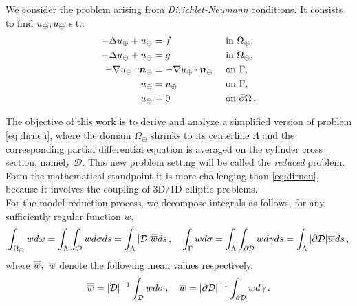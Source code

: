 \documentclass[r]{siamart171218}
\begin{document}
We consider the problem arising from \emph{Dirichlet-Neumann} conditions. 
It consists to find $u_{\oplus},u_{\ominus}$ s.t.:
\begin{subequations}\label{eq:dirneu}
\begin{align}
\label{eq:dirneu1}
- \Delta \up  + \up &= f  && \text{ in } \Omega_{\oplus},\\
\label{eq:dirneu2}
- \Delta \uf  + \uf &= g  && \text{ in } \Omega_\ominus,\\
\label{eq:dirneu3}
-\nabla \uf \cdot \nn_{\ominus} &= -\nabla \up \cdot \nn_{\ominus}  && \text{ on } \Gamma,\\
\label{eq:dirneu4}
\uf &= \up && \text{ on }  \Gamma,\\
\label{eq:dirneu5}
\up &= 0 && \text{ on } \partial \Omega\,.
\end{align}
\end{subequations}

The objective of this work is to derive and analyze a simplified version of problem \eqref{eq:dirneu}, where the domain $\Omega_\ominus$ shrinks to its centerline $\Lambda$ and the corresponding partial differential equation is averaged on the cylinder cross section, namely $\mathcal{D}$. This new problem setting will be called the \emph{reduced} problem. Form the mathematical standpoint it is more challenging than \eqref{eq:dirneu}, because it involves the coupling of 3D/1D elliptic problems.\\

For the model reduction process, we decompose integrals as follows, for any sufficiently regular function $w$,
\begin{equation*}
\int_{\Omega_\ominus} w d\omega 
= \int_\Lambda \int_{\mathcal{D}} w d\sigma ds
= \int_\Lambda |\mathcal{D}|\overline{\overline{w}} ds\,,
\quad
\int_{\Gamma} w d\sigma 
= \int_\Lambda \int_{\partial\mathcal{D}} w d\gamma ds
= \int_\Lambda  |\partial \mathcal{D}| \overline{w} ds\,,
\end{equation*}
where $\overline{\overline{w}}, \ \overline{w}$ denote the following mean values respectively,
\begin{equation*}
\overline{\overline{w}} = |\mathcal{D}|^{-1} \int_{\mathcal{D}} w d\sigma\,,
\quad
\overline{w} = |\partial\mathcal{D}|^{-1} \int_{\partial\mathcal{D}} w d\gamma\,.
\end{equation*}
\end{document}
